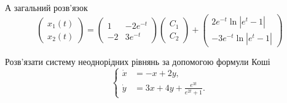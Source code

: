 \begin{solution}
	А загальний розв'язок 
	\begin{equation*}
		\begin{pmatrix} x_1(t) \\ x_2(t) \end{pmatrix} = \begin{pmatrix} 1 & -2e^{-t} \\ -2 & 3e^{-t} \end{pmatrix} \begin{pmatrix} C_1 \\ C_2 \end{pmatrix} + \begin{pmatrix} 2 e^{-t} \ln |e^t - 1| \\ - 3 e^{-t} \ln |e^t - 1| \end{pmatrix}
	\end{equation*}
\end{solution}

\begin{example}
	Розв'язати систему неоднорідних рівнянь за допомогою формули Коші
	\begin{equation*}
		\left\{
			\begin{aligned}
				\dot x &= - x + 2 y, \\
				\dot y &= 3 x + 4 y + \frac{e^{3 t}}{e^{2 t} + 1}.
			\end{aligned}
		\right.
	\end{equation*}
\end{example}

